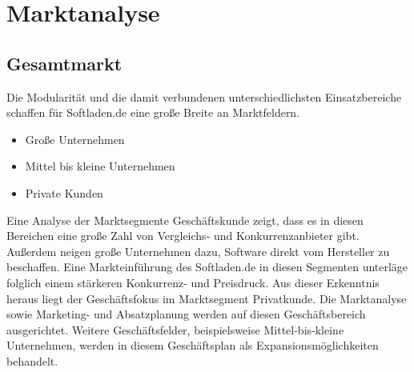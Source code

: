 \chapter{Marktanalyse}
\section{Gesamtmarkt}
Die Modularität und die damit verbundenen unterschiedlichsten Einsatzbereiche schaffen
für Softladen.de eine große Breite an Marktfeldern.
\begin{itemize}
	\item Große Unternehmen
	\item Mittel bis kleine Unternehmen
	\item Private Kunden
\end{itemize}
Eine Analyse der Marktsegmente Geschäftskunde zeigt, dass es in diesen Bereichen eine große Zahl von Vergleichs- und Konkurrenzanbieter gibt. Außerdem neigen große Unternehmen dazu, Software direkt vom Hersteller zu beschaffen. Eine Markteinführung des Softladen.de in diesen Segmenten unterläge folglich einem stärkeren Konkurrenz- und Preisdruck. Aus dieser Erkenntnis heraus liegt der Geschäftsfokus im Marktsegment Privatkunde. Die Marktanalyse sowie Marketing- und Absatzplanung werden auf diesen Geschäftsbereich ausgerichtet. Weitere Geschäftsfelder, beispielsweise Mittel-bis-kleine Unternehmen, werden in diesem Geschäftsplan als Expansionsmöglichkeiten behandelt.
